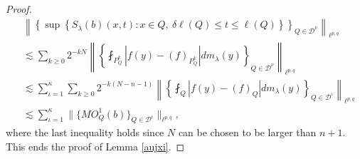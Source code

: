 \documentclass[12pt]{amsart}
\begin{document}
\begin{proof}
\begin{align*}
&\left\|\left\{\sup\limits\left\{S_\lambda(b)(x,t):x\in Q,\ \delta\ell(Q)\leq t\leq \ell(Q)\right\}\right\}_{Q\in\mathcal{D}^\nu}\right\|_{\ell^{p,q}}\\
&\lesssim \sum_{k\geq 0}2^{-kN}\left\|\left\{\fint_{P_Q^k}|f(y)-(f)_{P_Q^k}|dm_\lambda(y)\right\}_{Q\in\mathcal{D}^\nu}\right\|_{\ell^{p,q}}\\
&\lesssim \sum_{\iota=1}^\kappa\sum_{k\geq 0}2^{-k(N-n-1)}\left\|\left\{\fint_{Q}|f(y)-(f)_{Q}|dm_\lambda(y)\right\}_{Q\in\mathcal{D}^\iota}\right\|_{\ell^{p,q}}\\
&\lesssim \sum_{\iota=1}^\kappa\|\{MO_Q^1(b)\}_{Q\in\mathcal{D}^\iota}\|_{\ell^{p,q}},
\end{align*}
where the last inequality holds since $N$ can be chosen to be larger than $n+1$. This ends the proof of Lemma \ref{aujxi}.
\end{proof}
\end{document}

